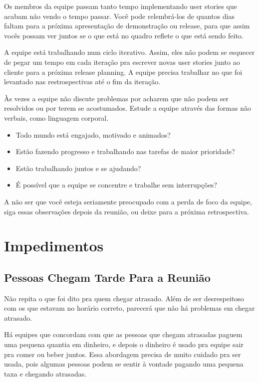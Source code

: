 \documentclass[a4paper, 10pt, font=plain]{abnt}
\begin{document}
Os membros da equipe passam tanto tempo implementando user stories que acabam não vendo o tempo passar. Você pode relembrá-los de quantos dias faltam para a próxima apresentação de demonstração ou release, para que assim vocês possam ver juntos se o que está no quadro reflete o que está sendo feito.

A equipe está trabalhando num ciclo iterativo. Assim, eles não podem se esquecer de pegar um tempo em cada iteração pra escrever novas user stories junto ao cliente para a próxima release planning. A equipe precisa trabalhar no que foi levantado nas restrospectivas até o fim da iteração.

Às vezes a equipe não discute problemas por acharem que não podem ser resolvidos ou por terem se acostumados. Estude a equipe através das formas não verbais, como linguagem corporal.

\begin{itemize}
\item Todo mundo está engajado, motivado e animados?
\item Estão fazendo progresso e trabalhando nas tarefas de maior prioridade?
\item Estão trabalhando juntos e se ajudando?
\item É possível que a equipe se concentre e trabalhe sem interrupções?
\end{itemize}

A não ser que você esteja seriamente preocupado com a perda de foco da equipe, siga essas observações depois da reunião, ou deixe para a próxima retrospectiva.


\section{Impedimentos}

\subsection{Pessoas Chegam Tarde Para a Reunião}
Não repita o que foi dito pra quem chegar atrasado. Além de ser desrespeitoso com os que estavam no horário correto, parecerá que não há problemas em chegar atrasado.

Há equipes que concordam com que as pessoas que chegam atrasadas paguem uma pequena quantia em dinheiro, e depois o dinheiro é usado pra equipe sair pra comer ou beber juntos. Essa abordagem precisa de muito cuidado pra ser usada, pois algumas pessoas podem se sentir à vontade pagando uma pequena taxa e chegando atrasadas.
\end{document}
